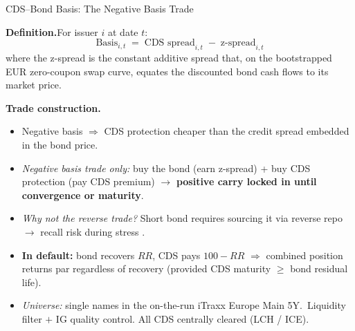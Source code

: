 \documentclass[aspectratio=169,11pt]{beamer}
\newcommand{\hlt}[1]{\textcolor{edhecred}{\textbf{#1}}}     %
\newcommand{\hltb}[1]{\textcolor{accentblue}{\textbf{#1}}}  %
\begin{document}
\begin{frame}[t]{CDS--Bond Basis: The Negative Basis Trade}
\small

\textbf{Definition.}\hfill {\small For issuer $i$ at date $t$:}
\[
  \text{Basis}_{i,t} \;=\; \text{CDS spread}_{i,t} \;-\; \text{z-spread}_{i,t}
\]
where the z-spread is the constant additive spread that, on the bootstrapped
EUR zero-coupon swap curve, equates the discounted bond cash flows to its
market price.

\vspace{0.30cm}

\textbf{Trade construction.}
\begin{itemize}\itemsep=0.10cm
  \item Negative basis $\Rightarrow$ CDS protection cheaper than the credit spread
        embedded in the bond price.
  \item \emph{Negative basis trade only:} buy the bond (earn z-spread)
        + buy CDS protection (pay CDS premium) $\to$ \hlt{positive carry locked in
        until convergence or maturity}.
  \item \emph{Why not the reverse trade?} Short bond requires sourcing it via
        reverse repo $\to$ recall risk during stress \citep{bai2019cds}.
  \item \hltb{In default:} bond recovers $RR$, CDS pays $100-RR$
        $\Rightarrow$ combined position returns par regardless of recovery
        (provided CDS maturity $\geq$ bond residual life).
  \item \emph{Universe:} single names in the on-the-run iTraxx Europe Main 5Y.\
        Liquidity filter $+$ IG quality control. All CDS centrally cleared
        (LCH / ICE).
\end{itemize}

\end{frame}
\end{document}
